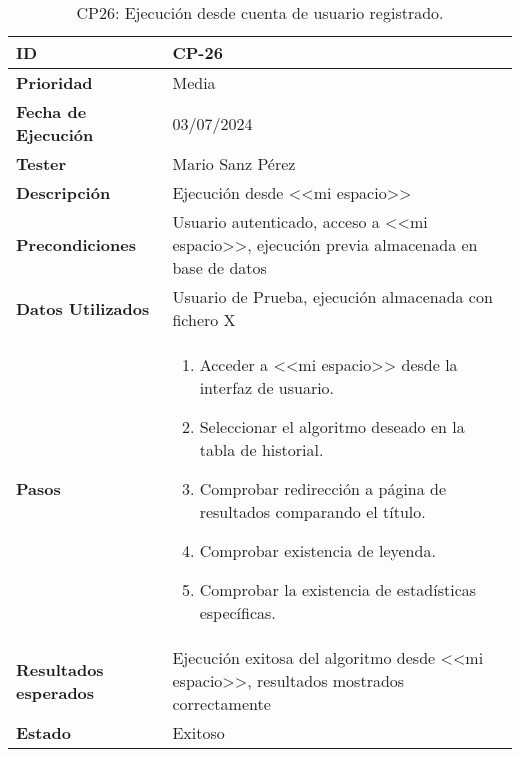 \begin{table}[ht]
	\centering
	\renewcommand{\arraystretch}{1.5} %
	\begin{tabular}{>{\raggedright\arraybackslash}p{4cm} p{9.5cm}}
    \hline
    \rowcolor{gray!20}
    \textbf{ID} & CP-26\\
    \hline
    \rowcolor{white}
    \textbf{Prioridad} & Media \\
    \hline
    \rowcolor{gray!20}
    \textbf{Fecha de Ejecución} & 03/07/2024 \\
    \hline
    \rowcolor{white}
    \textbf{Tester} & Mario Sanz Pérez \\
    \hline
    \rowcolor{gray!20}
    \textbf{Descripción} & Ejecución desde <<mi espacio>>\\
    \hline
    \rowcolor{white}
    \textbf{Precondiciones} & Usuario autenticado, acceso a <<mi espacio>>, ejecución previa almacenada en base de datos\\
    \hline
    \rowcolor{white}
    \textbf{Datos Utilizados} & Usuario de Prueba, ejecución almacenada con fichero X\\
    \hline
    \rowcolor{gray!20}
    \textbf{Pasos} & \begin{enumerate}
        \item Acceder a <<mi espacio>> desde la interfaz de usuario.
        \item Seleccionar el algoritmo deseado en la tabla de historial.
        \item Comprobar redirección a página de resultados comparando el título.
        \item Comprobar existencia de leyenda.
        \item Comprobar la existencia de estadísticas específicas.
    \end{enumerate}\\
	\hline
    \rowcolor{gray!20}
    \textbf{Resultados esperados} & Ejecución exitosa del algoritmo desde <<mi espacio>>, resultados mostrados correctamente\\
    \hline
    \rowcolor{white}
    \textbf{Estado} & Exitoso\\
    \hline
    \end{tabular}
	\caption[CP26: Ejecución desde cuenta de usuario]{CP26: Ejecución desde cuenta de usuario registrado.}
\end{table}

